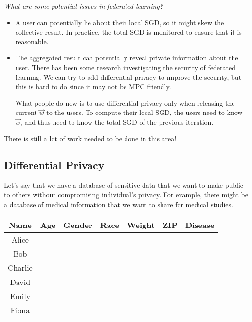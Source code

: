 \begin{remark}
    \textit{What are some potential issues in federated learning?}
    
    \begin{itemize}
        \item A user can potentially lie about their local SGD, so it might skew the collective result. In practice, the total SGD is monitored to ensure that it is reasonable.
        \item The aggregated result can potentially reveal private information about the user. There has been some research investigating the security of federated learning. We can try to add differential privacy to improve the security, but this is hard to do since it may not be MPC friendly.
        
        What people do now is to use differential privacy only when releasing the current $\vec{w}$ to the users. To compute their local SGD, the users need to know $\vec{w}$, and thus need to know the total SGD of the previous iteration.
    \end{itemize}

    There is still a lot of work needed to be done in this area!
\end{remark}


\subsection{Differential Privacy}

Let's say that we have a database of sensitive data that we want to make public to others without compromising individual's privacy. For example, there might be a database of medical information that we want to share for medical studies.

\begin{center}
    \begin{tabular}{|c|c|c|c|c|c|c|}
        \hline
        Name & Age & Gender & Race & Weight & ZIP & Disease\\ \hline
        Alice & & & & & &\\ \hline
        Bob & & & & & &\\ \hline
        Charlie & & & & & &\\ \hline
        David & & & & & &\\ \hline
        Emily & & & & & &\\ \hline
        Fiona & & & & & &\\ \hline
    \end{tabular}
\end{center}

